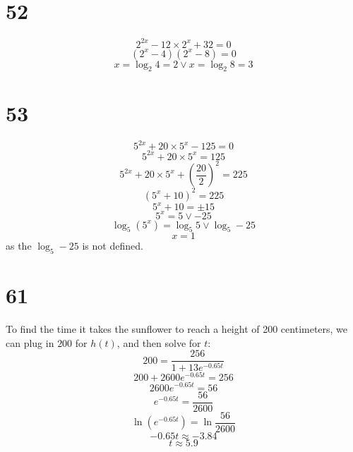 \documentclass{article}
\theoremstyle{definition}
\newcommand{\?}{\stackrel{?}{=}}
\begin{document}
\section*{52}
\[ 2^{2x}-12\times 2^x+32=0 \] \[ (2^x-4)(2^x-8)=0 \]
\[ x=\log_2 4=2\vee x=\log_2 8=3 \]

\section*{53}
\[ 5^{2x}+20\times 5^x-125=0 \] \[ 5^{2x}+20\times 5^x=125 \] \[ 5^{2x}+20\times 5^x+(\frac{20}{2})^2=225 \]
\[ (5^x+10)^2=225 \] \[ 5^x+10=\pm 15 \] \[ 5^x=5\vee -25 \] \[ \log_5 (5^x)=\log_5 5\vee \log_5 -25 \] \[ x=1 \] as the $\log_5 -25$ is not defined.

\section*{61}
To find the time it takes the sunflower to reach a height of 200 centimeters, we can plug in $200$ for $h(t)$, and then solve for $t$:
\[ 200=\frac{256}{1+13e^{-0.65t}} \] \[ 200+2600e^{-0.65t}=256 \] \[ 2600e^{-0.65t}=56 \] \[ e^{-0.65t}=\frac{56}{2600} \]
\[ \ln (e^{-0.65t})=\ln \frac{56}{2600} \] \[ -0.65t\approx -3.84 \] \[ t\approx 5.9 \]
\end{document}
